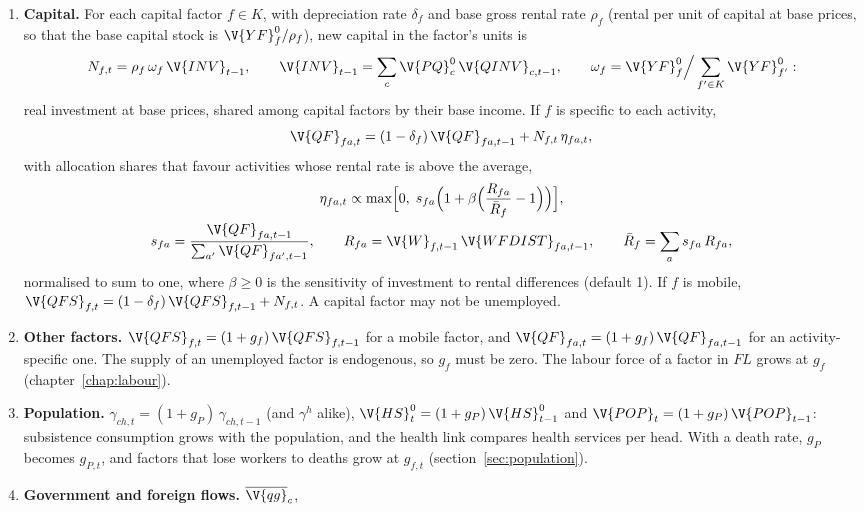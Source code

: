 \begin{enumerate}
\item \textbf{Capital.} For each capital factor $f \in K$, with depreciation
rate $\delta_f$ and base gross rental rate $\rho_f$ (rental per unit of capital
at base prices, so that the base capital stock is $\V{YF}^0_f / \rho_f$), new
capital in the factor's units is
\begin{equation*}
N_{f,t} = \rho_f\,\omega_f\,\V{INV}_{t-1}, \qquad
\V{INV}_{t-1} = \sum_c \V{PQ}^0_c\,\V{QINV}_{c,t-1}, \qquad
\omega_f = \V{YF}^0_f \Big/ \sum_{f' \in K} \V{YF}^0_{f'}:
\end{equation*}
real investment at base prices, shared among capital factors by their base
income. If $f$ is specific to each activity,
\begin{equation*}
\V{QF}_{fa,t} = (1 - \delta_f)\,\V{QF}_{fa,t-1} + N_{f,t}\,\eta_{fa,t},
\end{equation*}
with allocation shares that favour activities whose rental rate is above the
average,
\begin{gather*}
\eta_{fa,t} \propto \max\Bigl[0,\; s_{fa}\Bigl(1 + \beta\Bigl(\frac{R_{fa}}{\bar R_f} - 1\Bigr)\Bigr)\Bigr],\\
s_{fa} = \frac{\V{QF}_{fa,t-1}}{\sum_{a'} \V{QF}_{fa',t-1}}, \qquad
R_{fa} = \V{W}_{f,t-1}\,\V{WFDIST}_{fa,t-1}, \qquad
\bar R_f = \sum_a s_{fa}\,R_{fa},
\end{gather*}
normalised to sum to one, where $\beta \ge 0$ is the sensitivity of investment
to rental differences (default 1). If $f$ is mobile,
$\V{QFS}_{f,t} = (1 - \delta_f)\,\V{QFS}_{f,t-1} + N_{f,t}$. A capital factor
may not be unemployed.
\item \textbf{Other factors.} $\V{QFS}_{f,t} = (1 + g_f)\,\V{QFS}_{f,t-1}$ for
a mobile factor, and $\V{QF}_{fa,t} = (1 + g_f)\,\V{QF}_{fa,t-1}$ for an
activity-specific one. The supply of an unemployed factor is endogenous, so
$g_f$ must be zero. The labour force of a factor in $FL$ grows at $g_f$
(chapter~\ref{chap:labour}).
\item \textbf{Population.} $\gamma_{ch,t} = (1 + g_P)\,\gamma_{ch,t-1}$ (and
$\gamma^h$ alike), $\V{HS}^0_t = (1 + g_P)\,\V{HS}^0_{t-1}$ and
$\V{POP}_t = (1 + g_P)\,\V{POP}_{t-1}$: subsistence consumption grows with the
population, and the health link compares health services per head. With a death rate, $g_P$ becomes $g_{P,t}$, and factors
that lose workers to deaths grow at $g_{f,t}$ (section~\ref{sec:population}).
\item \textbf{Government and foreign flows.} $\overline{\V{qg}}_c$,

\end{enumerate}
